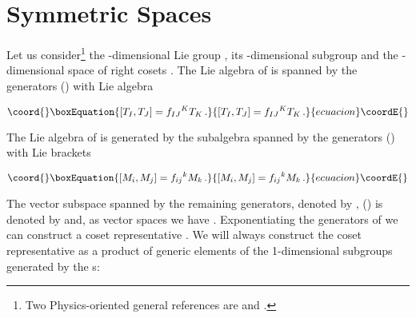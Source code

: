 \documentclass[12pt,a4paper]{article}
\begin{document}

\section{Symmetric Spaces}
\label{sec-symmetric}

Let us consider\footnote{Two Physics-oriented general references are
  \cite{Castellani:et} and \cite{Coquereaux:ne}.} the
\coordHE{}-dimensional Lie group \coordHE{}, its \coordHE{}-dimensional subgroup \coordHE{}
and the \coordHE{}-dimensional space of right cosets \coordHE{}. The Lie
algebra \coordHE{} of \coordHE{} is spanned by the generators \coordHE{}
(\coordHE{}) with Lie algebra

\begin{equation}\coord{}\boxEquation{
[T_{I},T_{J}] = f_{IJ}{}^{K}T_{K}\, .  
}{
[T_{I},T_{J}] = f_{IJ}{}^{K}T_{K}\, .  
}{ecuacion}\coordE{}\end{equation}

\noindent
The Lie algebra of \coordHE{} is generated by the subalgebra
\coordHE{} spanned by the generators \coordHE{}
(\coordHE{}) with Lie brackets

\begin{equation}\coord{}\boxEquation{
[M_{i},M_{j}] = f_{ij}{}^{k}M_{k}\, .  
}{
[M_{i},M_{j}] = f_{ij}{}^{k}M_{k}\, .  
}{ecuacion}\coordE{}\end{equation}

The vector subspace spanned by the remaining generators, denoted by
\coordHE{}, (\coordHE{}) is denoted by \coordHE{} and, as vector
spaces we have \coordHE{}.
Exponentiating the generators of \coordHE{} we can construct a
coset representative \coordHE{}. We will always
construct the coset representative as a product of generic elements of
the 1-dimensional subgroups generated by the \coordHE{}s:
\end{document}

